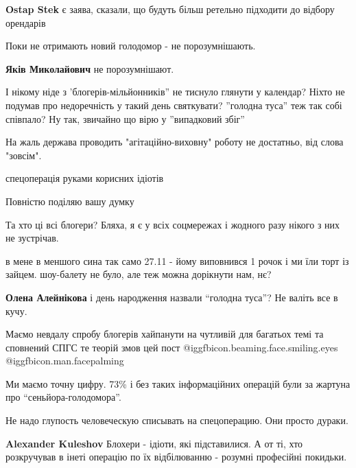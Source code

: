\begin{itemize}
\begin{itemize} %
\textbf{Ostap Stek} є заява, сказали, що будуть більш ретельно підходити до відбору орендарів
\end{itemize} %

Поки не отримають новий голодомор - не порозумнішають.

\textbf{Яків Миколайович} не порозумнішают.


І нікому ніде з 'блогерів-мільйонників'' не тиснуло глянути у календар? Ніхто
не подумав про недоречність у такий день святкувати? ''голодна туса'' теж так
собі співпало? Ну так, звичайно що вірю у ''випадковий збіг''

На жаль держава проводить "агітаційно-виховну" роботу не достатньо, від слова "зовсім".

спецоперація руками корисних ідіотів

Повністю поділяю вашу думку

Та хто ці всі блогери?
Бляха, я є у всіх соцмережах і жодного разу нікого з них не зустрічав.


в мене в меншого сина так само 27.11 - йому виповнився 1 рочок і ми їли торт із
зайцем. шоу-балету не було, але теж можна дорікнути нам, нє?

\begin{itemize} %
\textbf{Олена Алейнікова} і день народження назвали \enquote{голодна туса}? Не валіть все в кучу.
\end{itemize} %

Маємо невдалу спробу блогерів хайпанути на чутливій для багатьох темі та сповнений СПГС те теорій змов цей пост
 @igg{fbicon.beaming.face.smiling.eyes}  @igg{fbicon.man.facepalming} 

Ми маємо точну цифру. 73\% і без таких інформаційних операцій були за жартуна про \enquote{сеньйора-голодомора}.

Не надо глупость человеческую списывать на спецоперацию. Они просто дураки.

\begin{itemize} %
\textbf{Alexander Kuleshov} Блохери - ідіоти, які підставилися. А от ті, хто розкручував в інеті операцію по їх відбілюванню - розумні професійні покидьки.


\end{itemize}
\end{itemize}
